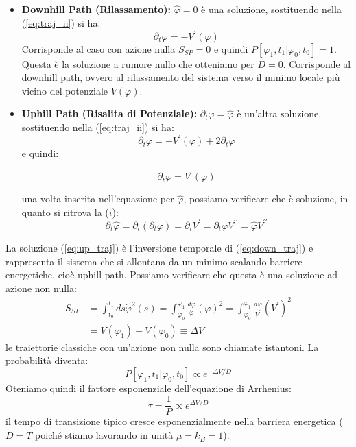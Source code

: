 \begin{itemize}
    \item \textbf{Downhill Path (Rilassamento):} $\hat{\varphi}=0$ è una soluzione, sostituendo nella (\ref{eq:traj_ii}) si ha:
    \begin{equation}
    \partial_{t}\varphi=-V^{\prime}(\varphi) \label{eq:down_traj}
    \end{equation}
    Corrisponde al caso con azione nulla $S_{SP}=0$ e quindi $P[\varphi_{1},t_{1}|\varphi_{0},t_{0}]=1$.
    Questa è la soluzione a rumore nullo che otteniamo per $D=0$.
    Corrisponde al downhill path, ovvero al rilassamento del sistema verso il minimo locale più vicino del potenziale $V(\varphi)$.
    
    \item \textbf{Uphill Path (Risalita di Potenziale):} $\partial_{t}\varphi=\hat{\varphi}$ è un’altra soluzione, sostituendo nella (\ref{eq:traj_ii}) si ha:
    \begin{equation}
    \partial_{t}\varphi=-V^{\prime}(\varphi)+2\partial_{t}\varphi
    \end{equation}
    e quindi:
    \begin{tcolorbox}[colback=colorA!5, colframe=colorA, arc=3mm, boxrule=1.2pt]
    \begin{equation}
    \partial_{t}\varphi=V^{\prime}(\varphi) \label{eq:up_traj}
    \end{equation}
    \end{tcolorbox}
    una volta inserita nell'equazione per $\hat{\varphi}$, possiamo verificare che è soluzione, in quanto si ritrova la ($i$):
    \begin{equation}
    \partial_{t}\hat{\varphi}=\partial_{t}(\partial_{t}\varphi)=\partial_{t}V^{\prime}=\partial_{t}\varphi V^{\prime\prime}=\hat{\varphi}V^{\prime\prime}
    \end{equation}
\end{itemize}
La soluzione (\ref{eq:up_traj}) è l'inversione temporale di (\ref{eq:down_traj}) e rappresenta il sistema che si allontana da un minimo scalando barriere energetiche, cioè uphill path.
Possiamo verificare che questa è una soluzione ad azione non nulla:
\begin{align}
S_{SP}&=\int_{t_{0}}^{t_{1}}ds\dot{\varphi}^{2}(s)=\int_{\varphi_{0}}^{\varphi_{1}}\frac{d\varphi}{\dot{\varphi}}(\dot{\varphi})^{2}=\int_{\varphi_{0}}^{\varphi_{1}}\frac{d\varphi}{V^{\prime}}(V^{\prime})^{2} \nonumber \\ 
&=V(\varphi_{1})-V(\varphi_{0}) \equiv \Delta V
\end{align}
le traiettorie classiche con un'azione non nulla sono chiamate istantoni.
La probabilità diventa:
\begin{equation}
P[\varphi_{1},t_{1}|\varphi_{0},t_{0}]\propto e^{-\Delta V/D}
\end{equation}
Oteniamo quindi il fattore esponenziale dell'equazione di Arrhenius:
\begin{equation}
\tau= \frac{1}{P}\propto e^{\Delta V/D}
\end{equation}
il tempo di transizione tipico cresce esponenzialmente nella barriera energetica ( $D=T$ poiché stiamo lavorando in unità $\mu=k_{B}=1$).

